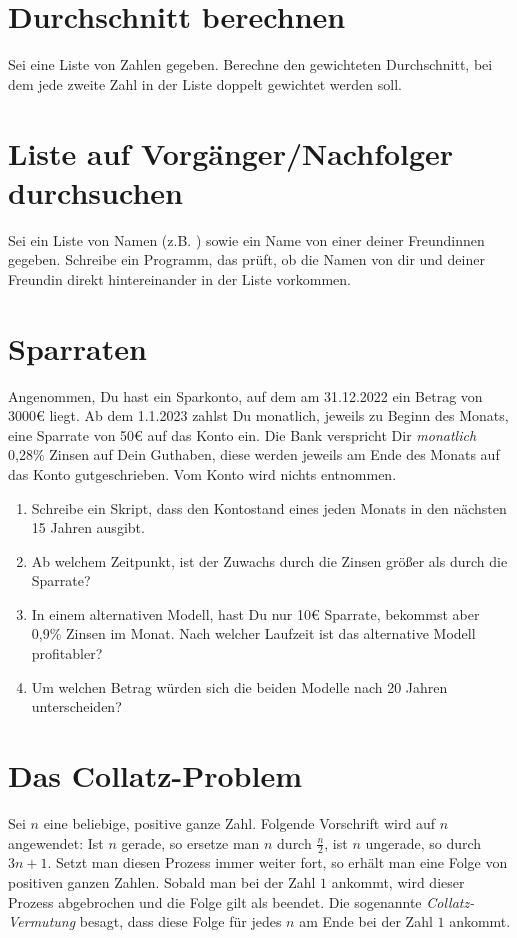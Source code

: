 \documentclass[a4paper]{article}
\begin{document}






\section{Durchschnitt berechnen}
Sei eine Liste von Zahlen gegeben. Berechne den gewichteten Durchschnitt, bei dem jede zweite Zahl in der Liste doppelt gewichtet werden soll.


\section{Liste auf Vorgänger/Nachfolger durchsuchen}
Sei ein Liste von Namen (z.B. ) sowie ein Name von einer deiner Freundinnen gegeben. Schreibe ein Programm, das prüft, ob die Namen von dir und deiner Freundin direkt hintereinander in der Liste vorkommen. 

\section{Sparraten}
Angenommen, Du hast ein Sparkonto, auf dem am 31.12.2022 ein Betrag von 3000€ liegt. Ab dem 1.1.2023 zahlst Du monatlich, jeweils zu Beginn des Monats, eine Sparrate von 50€ auf das Konto ein. Die Bank verspricht Dir \emph{monatlich} 0,28\% Zinsen auf Dein Guthaben, diese werden jeweils am Ende des Monats auf das Konto gutgeschrieben. Vom Konto wird nichts entnommen. 
 
\begin{enumerate}
\item Schreibe ein Skript, dass den Kontostand eines jeden Monats in den nächsten 15 Jahren ausgibt.
\item Ab welchem Zeitpunkt, ist der Zuwachs durch die Zinsen größer als durch die Sparrate?
\item In einem alternativen Modell, hast Du nur 10€ Sparrate, bekommst aber 0,9\% Zinsen im Monat. Nach welcher Laufzeit ist das alternative Modell profitabler?
\item Um welchen Betrag würden sich die beiden Modelle nach 20 Jahren unterscheiden?
\end{enumerate} 

\section{Das Collatz-Problem}
Sei $n$ eine beliebige, positive ganze Zahl. Folgende Vorschrift wird auf $n$ angewendet: Ist $n$ gerade, so ersetze man $n$ durch $\frac{n}{2}$, ist $n$ ungerade, so durch $3n + 1$. Setzt man diesen Prozess immer weiter fort, so erhält man eine Folge von positiven ganzen Zahlen. Sobald man bei der Zahl $1$ ankommt, wird dieser Prozess abgebrochen und die Folge gilt als beendet. Die sogenannte \emph{Collatz-Vermutung} besagt, dass diese Folge für jedes $n$ am Ende bei der Zahl $1$ ankommt. 
\end{document}
